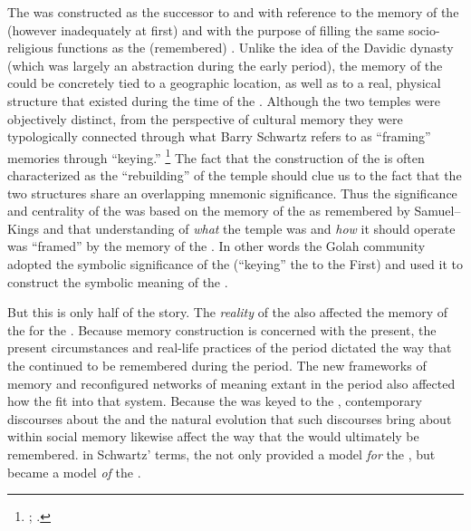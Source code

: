 The \secondtemple was constructed as the successor to and with reference to the memory of the \firsttemple (however inadequately at first) and with the purpose of filling the same socio-religious functions as the (remembered) \firsttemple. Unlike the idea of the Davidic dynasty (which was largely an abstraction during the early \secondtemple period), the memory of the \firsttemple could be concretely tied to a geographic location, as well as to a real, physical structure that existed during the time of the \chronicler. Although the two temples were objectively distinct, from the perspective of cultural memory they were typologically  connected through what Barry Schwartz refers to as ``framing'' memories through ``keying.''%
    \footnote{\cite{schwartz_asr1996}; \cite{thatcher_thatcher2014}.}
The fact that the construction of the \secondtemple is often characterized as the ``rebuilding'' of the temple should clue us to the fact that the two structures share an overlapping mnemonic significance. Thus the significance and centrality of the \secondtemple was based on the memory of the \firsttemple as remembered by Samuel--Kings and that understanding of \emph{what} the temple was and \emph{how} it should operate was ``framed'' by the memory of the \firsttemple. In other words the Golah community adopted the symbolic significance of the \firsttemple (``keying'' the \secondtemple to the First) and used it to construct the symbolic meaning of the \secondtemple.

But this is only half of the story. The \emph{reality} of the \secondtemple also affected the memory of the \firsttemple for the \chronicler. Because memory construction is concerned with the present, the present circumstances and real-life practices of the \secondtemple period dictated the way that the \firsttemple continued to be remembered during the \secondtemple period. The new frameworks of memory and reconfigured networks of meaning extant in the \secondtemple period also affected how the \firsttemple fit into that system. Because the \secondtemple was keyed to the \firsttemple, contemporary discourses about the \secondtemple and the natural evolution that such discourses bring about within social memory likewise affect the way that the \firsttemple would ultimately be remembered. in Schwartz' terms, the \firsttemple not only provided a model \emph{for} the \secondtemple, but became a model \emph{of} the \secondtemple.
    \autocite[18]{schwartz2000}


